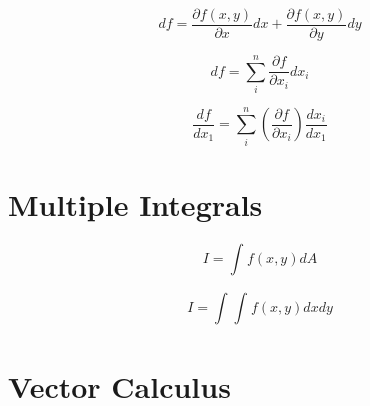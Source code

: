 \documentclass[]{report}
\begin{document}
\begin{equation*}
    df = \frac{\partial f(x, y)}{\partial x}dx + \frac{\partial f(x, y)}{\partial y}dy
\end{equation*}

\begin{equation*}
    df = \sum_{i}^{n}\frac{\partial f}{\partial x_{i}}dx_{i}
\end{equation*}

\begin{equation*}
    \frac{df}{dx_{1}} = \sum_{i}^{n}\left(\frac{\partial f}{\partial x_{i}}\right)\frac{dx_{i}}{dx_{1}}
\end{equation*}

\chapter{Multiple Integrals}

\begin{equation*}
    I = \int_{}^{}f(x,y)dA
\end{equation*}

\begin{equation*}
    I = \int_{}^{}\int_{}^{}f(x,y)dxdy
\end{equation*}

\chapter{Vector Calculus}
\end{document}
